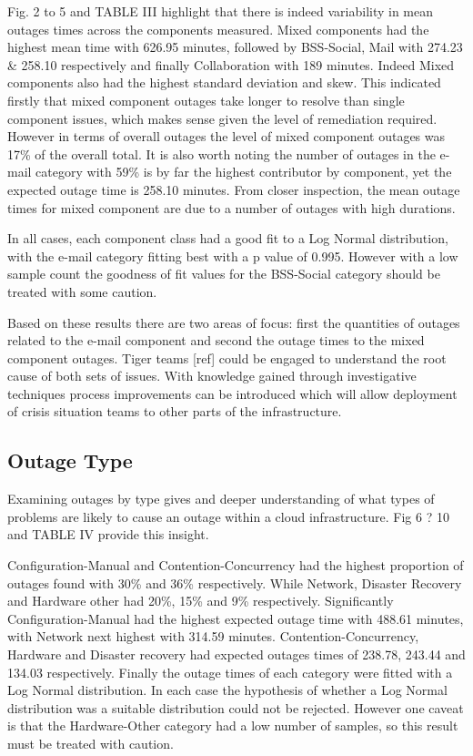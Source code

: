 \documentclass[conference]{IEEEtran}
\begin{document}
Fig. 2 to 5 and TABLE III highlight that there is indeed variability in mean outages times across the components measured. Mixed components had the highest mean time with 626.95 minutes, followed by BSS-Social, Mail with 274.23 \& 258.10 respectively and finally Collaboration with 189 minutes. Indeed Mixed components also had the highest standard deviation and skew. This indicated firstly that mixed component outages take longer to resolve than single component issues, which makes sense given the level of remediation required. However in terms of overall outages the level of mixed component outages was 17\% of the overall total. It is also worth noting the number of outages in the e-mail category with 59\% is by far the highest contributor by component, yet the expected outage time is 258.10 minutes.  From closer inspection, the mean outage times for mixed component are due to a number of outages with high durations. \par

In all cases, each component class had a good fit to a Log Normal distribution, with the e-mail category fitting best with a p value of 0.995. However with a low sample count the goodness of fit values for the BSS-Social category should be treated with some caution. \par

Based on these results there are two areas of focus: first the quantities of outages related to the e-mail component and second the outage times to the mixed component outages. Tiger teams [ref] could be engaged to understand the root cause of both sets of issues. With knowledge gained through investigative techniques process improvements can be introduced which will allow deployment of crisis situation teams to other parts of the infrastructure. \par

\subsection{Outage Type}
Examining outages by type gives and deeper understanding of what types of problems are likely to cause an outage within a cloud infrastructure. Fig 6 ? 10 and TABLE IV provide this insight. \par

Configuration-Manual and Contention-Concurrency had the highest proportion of outages found with 30\% and 36\% respectively. While Network, Disaster Recovery and Hardware other had 20\%, 15\% and 9\% respectively. Significantly Configuration-Manual had the highest expected outage time with 488.61 minutes, with Network next highest with 314.59 minutes. Contention-Concurrency, Hardware and Disaster recovery had expected outages times of 238.78, 243.44 and 134.03 respectively. Finally the outage times of each category were fitted with a Log Normal distribution. In each case the hypothesis of whether a Log Normal distribution was a suitable distribution could not be rejected. However one caveat is that the Hardware-Other category had a low number of samples, so this result must be treated with caution. \par
\end{document}

